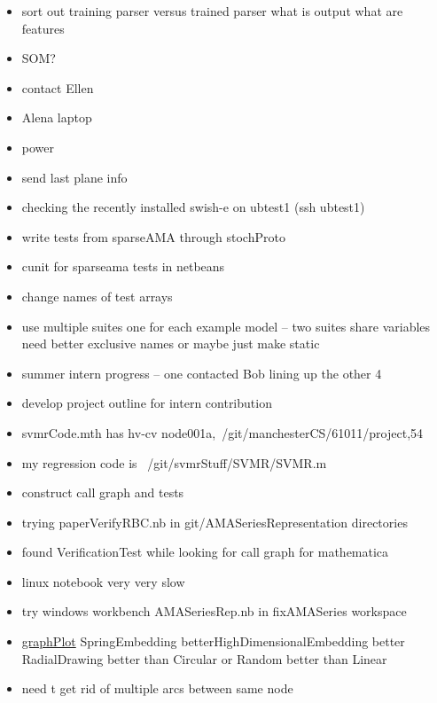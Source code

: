 \documentclass[hyperref]{labbook}
\begin{document}
\begin{itemize}
\item sort out training parser versus trained parser  what is output  what are features
\item SOM?
\item contact Ellen
\end{itemize}

\begin{itemize}
\item Alena laptop
\item power 
\item send last plane info
\item checking the recently installed swish-e on ubtest1   (ssh ubtest1)  
\end{itemize}


\begin{itemize}
\item write tests  from sparseAMA through stochProto
\item cunit for sparseama tests in netbeans 
\item change names of test arrays
\item use multiple suites one for each example model  -- two suites share variables need better exclusive names or maybe just make static
\end{itemize}

\begin{itemize}
\item summer intern progress -- one contacted Bob lining up the other 4
\item develop project outline for intern contribution
\item svmrCode.mth has  hv-cv {node001a,~/git/manchesterCS/61011/project,54}
\item my regression code is ~/git/svmrStuff/SVMR/SVMR.m
\end{itemize}

\begin{itemize}
\item construct call graph and tests 
\item trying paperVerifyRBC.nb in git/AMASeriesRepresentation directories

\item found VerificationTest while looking for call graph for mathematica
\item linux notebook very very slow
\item try windows workbench  AMASeriesRep.nb in fixAMASeries workspace
\item \href{https://reference.wolfram.com/language/ref/GraphPlot.html}{graphPlot} SpringEmbedding betterHighDimensionalEmbedding better RadialDrawing better than Circular or Random better than Linear
\item need t get rid of multiple arcs between same node
\end{itemize}
\end{document}
